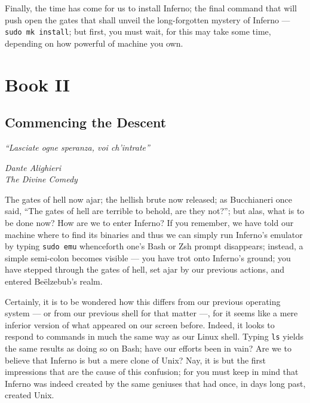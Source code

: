 \documentclass[a5paper,twoside,12pt]{report}
\begin{document}
Finally, the time has come for us to install Inferno; the final command that will push open the gates that shall unveil the long-forgotten mystery of Inferno — \texttt{sudo mk install}; but first, you must wait, for this may take some time, depending on how powerful of machine you own.

\newpage

\part*{Book II}
  \thispagestyle{empty}
  \newpage

\thispagestyle{empty}
  \mbox{}
  \newpage

\chapter*{Commencing the Descent}
  
  \epigraph{\textit{``Lasciate ogne speranza, voi ch'intrate''}}{\textit{Dante Alighieri\\The Divine Comedy}}

  The gates of hell now ajar; the hellish brute now released; as Bucchianeri once said, ``The gates of hell are terrible to behold, are they not?''; but alas, what is to be done now? How are we to enter Inferno? If you remember, we have told our machine where to find its binaries and thus we can simply run Inferno's emulator by typing \texttt{sudo emu} whenceforth one's Bash or Zsh prompt disappears; instead, a simple semi-colon becomes visible — you have trot onto Inferno's ground; you have stepped through the gates of hell, set ajar by our previous actions, and entered Be\"{e}lzebub's realm.

  Certainly, it is to be wondered how this differs from our previous operating system — or from our previous shell for that matter —, for it seems like a mere inferior version of what appeared on our screen before. Indeed, it looks to respond to commands in much the same way as our Linux shell. Typing \texttt{ls} yields the same results as doing so on Bash; have our efforts been in vain? Are we to believe that Inferno is but a mere clone of Unix? Nay, it is but the first impressions that are the cause of this confusion; for you must keep in mind that Inferno was indeed created by the same geniuses that had once, in days long past, created Unix.
\end{document}
